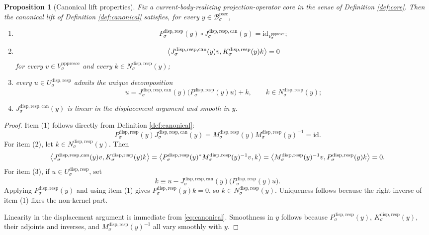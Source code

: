 \documentclass[11pt]{article}
\newcommand{\ProtoSectionBody}[1]{\mathcal B_{#1}^{\mathrm{psec}}}
\newcommand{\PrePreProtoSectionVertical}[1]{V_{#1}^{\mathrm{pppresec}}}
\newcommand{\SubstrateCarrier}[1]{U_{#1}^{\mathrm{disp,resp}}}
\newcommand{\SubstrateProjection}[1]{P_{#1}^{\mathrm{disp,resp}}}
\newcommand{\SubstrateOperator}[1]{K_{#1}^{\mathrm{disp,resp}}}
\newcommand{\CanonicalLift}[1]{J_{#1}^{\mathrm{disp,resp,can}}}
\newcommand{\SubstrateKernel}[1]{N_{#1}^{\mathrm{disp,resp}}}
\newcommand{\SchurResponse}[1]{M_{#1}^{\mathrm{disp,resp}}}
\newtheorem{proposition}{Proposition}
\begin{document}
\begin{proposition}[Canonical lift properties]
\label{prop:canonical}
Fix a current-body-realizing projection-operator core in the sense of Definition \ref{def:core}. Then the canonical lift of Definition \ref{def:canonical} satisfies, for every \(y\in\ProtoSectionBody{\sigma}\),
\begin{enumerate}
    \item
    \[
    \SubstrateProjection{\sigma}(y)\circ\CanonicalLift{\sigma}(y)
    =
    \mathrm{id}_{\PrePreProtoSectionVertical{\sigma}};
    \]
    \item
    \[
    \ev{
    \CanonicalLift{\sigma}(y)v,
    \SubstrateOperator{\sigma}(y)k
    }
    =
    0
    \]
    for every \(v\in\PrePreProtoSectionVertical{\sigma}\) and every \(k\in\SubstrateKernel{\sigma}(y)\);
    \item every \(u\in\SubstrateCarrier{\sigma}\) admits the unique decomposition
    \[
    u
    =
    \CanonicalLift{\sigma}(y)\bigl(\SubstrateProjection{\sigma}(y)u\bigr)
    +
    k,
    \qquad
    k\in\SubstrateKernel{\sigma}(y);
    \]
    \item \(\CanonicalLift{\sigma}(y)\) is linear in the displacement argument and smooth in \(y\).
\end{enumerate}
\end{proposition}

\begin{proof}
Item (1) follows directly from Definition \ref{def:canonical}:
\[
\SubstrateProjection{\sigma}(y)\CanonicalLift{\sigma}(y)
=
\SchurResponse{\sigma}(y)\SchurResponse{\sigma}(y)^{-1}
=
\mathrm{id}.
\]
For item (2), let \(k\in\SubstrateKernel{\sigma}(y)\). Then
\[
\ev{
\CanonicalLift{\sigma}(y)v,
\SubstrateOperator{\sigma}(y)k
}
=
\ev{
\SubstrateProjection{\sigma}(y)^*
\SchurResponse{\sigma}(y)^{-1}v,
k
}
=
\ev{
\SchurResponse{\sigma}(y)^{-1}v,
\SubstrateProjection{\sigma}(y)k
}
=
0.
\]
For item (3), if \(u\in\SubstrateCarrier{\sigma}\), set
\[
k
\equiv
u-\CanonicalLift{\sigma}(y)\bigl(\SubstrateProjection{\sigma}(y)u\bigr).
\]
Applying \(\SubstrateProjection{\sigma}(y)\) and using item (1) gives \(\SubstrateProjection{\sigma}(y)k=0\), so \(k\in\SubstrateKernel{\sigma}(y)\). Uniqueness follows because the right inverse of item (1) fixes the non-kernel part.

Linearity in the displacement argument is immediate from \eqref{eq:canonical}. Smoothness in \(y\) follows because \(\SubstrateProjection{\sigma}(y)\), \(\SubstrateOperator{\sigma}(y)\), their adjoints and inverses, and \(\SchurResponse{\sigma}(y)^{-1}\) all vary smoothly with \(y\).
\end{proof}
\end{document}
